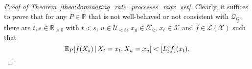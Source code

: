 \documentclass[10pt,a4paper]{paper}
\theoremstyle{definition}
\newcommand{\reals}{\mathbb{R}}
\newcommand{\realspos}{\reals_{>0}}
\newcommand{\realsnonneg}{\reals_{\geq 0}}
\newcommand{\states}{\mathcal{X}}
\newcommand{\processes}{\mathbb{P}}
\newcommand{\wprocesses}{\processes^{\mathrm{W}}}
\newcommand{\gambles}{\mathcal{L}}
\newcommand{\gamblesX}{\gambles(\states)}
\newcommand{\ind}[1]{\mathbb{I}_{#1}}
\newcommand{\rateset}{\mathcal{Q}}
\newcommand{\lrate}{\underline{Q}}
\newcommand{\norm}[1]{\left\lVert #1 \right\rVert}
\newcommand{\abs}[1]{\left\vert #1 \right\vert}
\begin{document}
\begin{proof}[Proof of Theorem~\ref{theo:dominating_rate_processes_max_set}]

Clearly, it suffices to prove that for any $P\in\processes$ that is not well-behaved or not consistent with $\rateset_{\lrate}$, there are $t,s\in\realsnonneg$ with $t< s$, $u\in\mathcal{U}_{<t}$, $x_u\in\states_u$, $x_t\in\states$ and $f\in\gamblesX$ such that
\begin{equation}\label{eq:theo:dominating_rate_processes_max_set:toprove}
\mathbb{E}_P[f(X_s)\,\vert\,X_t=x_t,X_u=x_u] < [L_t^sf](x_t).\vspace{5pt}
\end{equation}


\end{proof}
\end{document}

